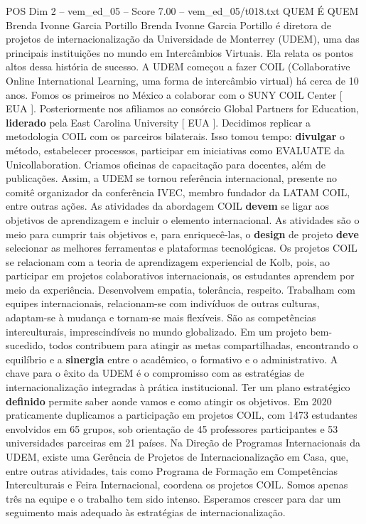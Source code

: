 \begin{textsample}{POS Dim 2 – vem\_ed\_05 – Score 7.00 – vem\_ed\_05/t018.txt}  \label{ex:f2_pos_091}
QUEM É QUEM Brenda Ivonne Garcia Portillo Brenda Ivonne Garcia Portillo é diretora de projetos de internacionalização da Universidade de Monterrey (UDEM), uma das principais instituições no mundo em Intercâmbios Virtuais.
Ela relata os pontos altos dessa história de sucesso.
A UDEM começou a fazer COIL (Collaborative Online International Learning, uma forma de intercâmbio virtual) há cerca de 10 anos.
Fomos os primeiros no México a colaborar com o SUNY COIL Center [ EUA ].
Posteriormente nos afiliamos ao consórcio Global Partners for Education, \textbf{liderado} pela East Carolina University [ EUA ].
Decidimos replicar a metodologia COIL com os parceiros bilaterais.
Isso tomou tempo: \textbf{divulgar} o método, estabelecer processos, participar em iniciativas como EVALUATE da Unicollaboration.
Criamos oficinas de capacitação para docentes, além de publicações.
Assim, a UDEM se tornou referência internacional, presente no comitê organizador da conferência IVEC, membro fundador da LATAM COIL, entre outras ações.
As atividades da abordagem COIL \textbf{devem} se ligar aos objetivos de aprendizagem e incluir o elemento internacional.
As atividades são o meio para cumprir tais objetivos e, para enriquecê-las, o \textbf{design} de projeto \textbf{deve} selecionar as melhores ferramentas e plataformas tecnológicas.
Os projetos COIL se relacionam com a teoria de aprendizagem experiencial de Kolb, pois, ao participar em projetos colaborativos internacionais, os estudantes aprendem por meio da experiência.
Desenvolvem empatia, tolerância, respeito.
Trabalham com equipes internacionais, relacionam-se com indivíduos de outras culturas, adaptam-se à mudança e tornam-se mais flexíveis.
São as competências interculturais, imprescindíveis no mundo globalizado.
Em um projeto bem-sucedido, todos contribuem para atingir as metas compartilhadas, encontrando o equilíbrio e a \textbf{sinergia} entre o acadêmico, o formativo e o administrativo.
A chave para o êxito da UDEM é o compromisso com as estratégias de internacionalização integradas à prática institucional.
Ter um plano estratégico \textbf{definido} permite saber aonde vamos e como atingir os objetivos.
Em 2020 praticamente duplicamos a participação em projetos COIL, com 1473 estudantes envolvidos em 65 grupos, sob orientação de 45 professores participantes e 53 universidades parceiras em 21 países.
Na Direção de Programas Internacionais da UDEM, existe uma Gerência de Projetos de Internacionalização em Casa, que, entre outras atividades, tais como Programa de Formação em Competências Interculturais e Feira Internacional, coordena os projetos COIL.
Somos apenas três na equipe e o trabalho tem sido intenso.
Esperamos crescer para dar um seguimento mais adequado às estratégias de internacionalização.

\end{textsample}
